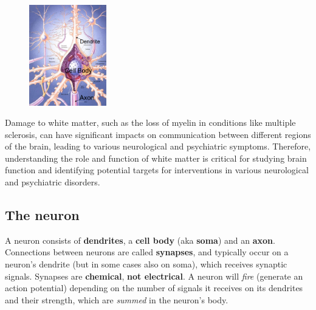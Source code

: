 \begin{figure}
  \centering
  \includegraphics[width=0.3\textwidth]{images/neuron.png}
\end{figure}
Damage to white matter, such as the loss of myelin in conditions like multiple sclerosis, can have significant impacts on communication between different regions of the brain, leading to various neurological and psychiatric symptoms. Therefore, understanding the role and function of white matter is critical for studying brain function and identifying potential targets for interventions in various neurological and psychiatric disorders.

\subsection{The neuron}
A neuron consists of \textbf{dendrites}, a \textbf{cell body} (aka \textbf{soma}) and an \textbf{axon}. Connections between neurons are called \textbf{synapses}, and typically occur on a neuron’s dendrite (but in some cases also on soma), which receives synaptic signals. Synapses are \textbf{chemical}, \textbf{not electrical}.
A neuron will \textit{fire} (generate an action potential) depending on the number of signals it receives on its dendrites and their strength, which are \textit{summed} in the neuron’s body. 


